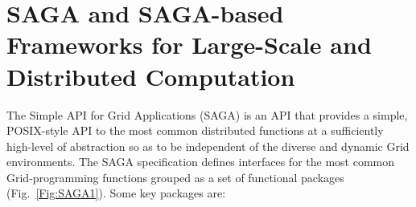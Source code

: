 \documentclass{rspublic}
\begin{document}

\section{SAGA and SAGA-based Frameworks for Large-Scale and
 Distributed Computation}\label{Sec:SAGA}


The Simple API for Grid Applications (SAGA) is an API
that provides a simple, POSIX-style API to the most common distributed
functions at a sufficiently high-level of abstraction so as to be
independent of the diverse and dynamic Grid environments. The SAGA
specification defines interfaces for the most common Grid-programming
functions grouped as a set of functional packages
(Fig.~\ref{Fig:SAGA1}). Some key packages are:
\end{document}
